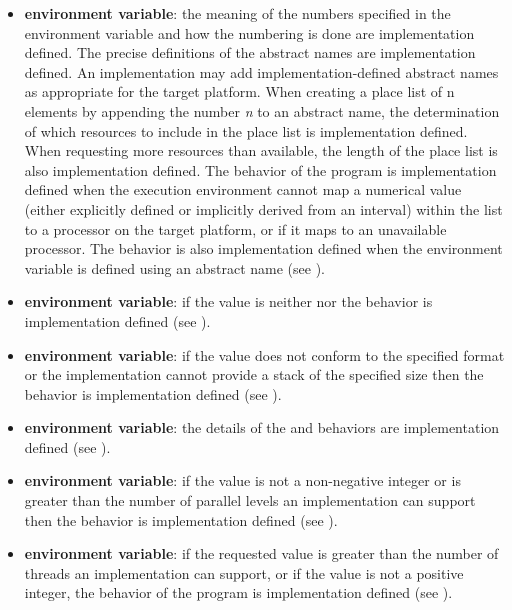 \begin{itemize}
\item {} \textbf{environment variable}: the meaning of the numbers specified in the
environment variable and how the numbering is done are implementation defined.
The precise definitions of the abstract names are implementation defined. An
implementation may add implementation-defined abstract names as appropriate for
the target platform. When creating a place list of n elements by appending the
number \emph{n} to an abstract name, the determination of which resources to include in the
place list is implementation defined. When requesting more resources than available,
the length of the place list is also implementation defined. The behavior of the
program is implementation defined when the execution environment cannot map a
numerical value (either explicitly defined or implicitly derived from an interval)
within the  list to a processor on the target platform, or if it maps to an
unavailable processor. The behavior is also implementation defined when the
 environment variable is defined using an abstract name (see ).

\item {} \textbf{environment variable}: if the value is neither
 nor  the behavior is implementation defined (see
).

\item {} \textbf{environment variable}: if the value does not conform to the
specified format or the implementation cannot provide a stack of the specified size
then the behavior is implementation defined (see ).

\item {} \textbf{environment variable}: the details of the  and
 behaviors are implementation defined (see ).

\item {} \textbf{environment variable}: if the value is not a
non-negative integer or is greater than the number of parallel levels an implementation
can support then the behavior is implementation defined (see ).

\item {} \textbf{environment variable}: if the requested value is greater than
the number of threads an implementation can support, or if the value is not a positive
integer, the behavior of the program is implementation defined (see ).


\end{itemize}
